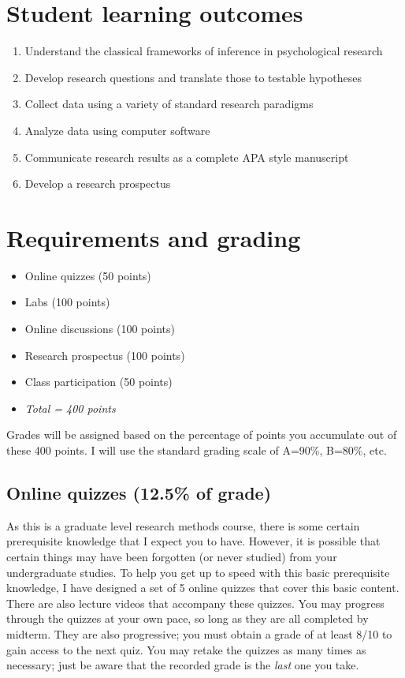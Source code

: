\documentclass[10pt]{article}
\begin{document}
\section*{Student learning outcomes}
\label{sec-4}

\begin{enumerate}
\item Understand the classical frameworks of inference in psychological research
\item Develop research questions and translate those to testable hypotheses
\item Collect data using a variety of standard research paradigms
\item Analyze data using computer software
\item Communicate research results as a complete APA style manuscript
\item Develop a research prospectus
\end{enumerate}

\section*{Requirements and grading}
\label{sec-5}
\begin{itemize}
\item Online quizzes (50 points)
\item Labs (100 points)
\item Online discussions (100 points)
\item Research prospectus (100 points)
\item Class participation (50 points)
\item \emph{Total = 400 points}
\end{itemize}

Grades will be assigned based on the percentage of points you accumulate 
out of these 400 points.  I will use the standard grading scale of A=90\%, 
B=80\%, etc.

\subsection*{Online quizzes (12.5\% of grade)}
\label{sec-5-1}
As this is a graduate level research methods course, there is some certain prerequisite knowledge that I expect you to have. However, it is possible that certain things may have been forgotten (or never studied) from your undergraduate studies. To help you get up to speed with this basic prerequisite knowledge, I have designed a set of 5 online quizzes that cover this basic content.  There are also lecture videos that accompany these quizzes.  You may progress through the quizzes at your own pace, so long as they are all completed by midterm.  They are also progressive; you must obtain a grade of at least 8/10 to gain access to the next quiz.  You may retake the quizzes as many times as necessary; just be aware that the recorded grade is the \emph{last} one you take.
\end{document}
